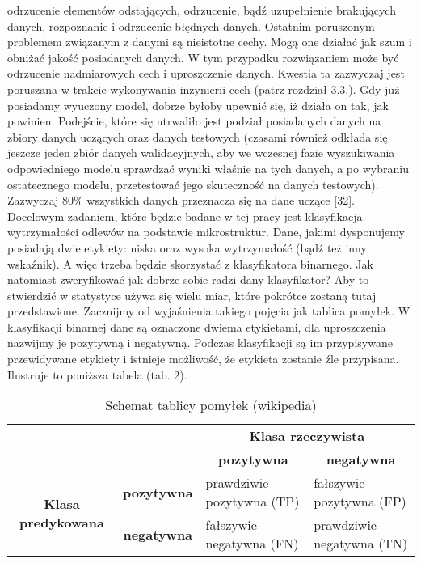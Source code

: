 odrzucenie elementów odstających,
odrzucenie, bądź uzupełnienie brakujących danych,
rozpoznanie i odrzucenie błędnych danych.
Ostatnim poruszonym problemem związanym z danymi są nieistotne cechy. Mogą one działać jak szum i obniżać jakość posiadanych danych. W tym przypadku rozwiązaniem może być odrzucenie nadmiarowych cech i uproszczenie danych. Kwestia ta zazwyczaj jest poruszana w trakcie wykonywania inżynierii cech (patrz rozdział 3.3.).
Gdy już posiadamy wyuczony model, dobrze byłoby upewnić się, iż działa on tak, jak powinien. Podejście, które się utrwaliło jest podział posiadanych danych na zbiory danych uczących oraz danych testowych (czasami również odkłada się jeszcze jeden zbiór danych walidacyjnych, aby we wczesnej fazie wyszukiwania odpowiedniego modelu sprawdzać wyniki właśnie na tych danych, a po wybraniu ostatecznego modelu, przetestować jego skuteczność na danych testowych). Zazwyczaj 80\% wszystkich danych przeznacza się na dane uczące [32].
Docelowym zadaniem, które będzie badane w tej pracy jest klasyfikacja wytrzymałości odlewów na podstawie mikrostruktur. Dane, jakimi dysponujemy posiadają dwie etykiety: niska oraz wysoka wytrzymałość (bądź też inny wskaźnik). A więc trzeba będzie skorzystać z klasyfikatora binarnego. Jak natomiast zweryfikować jak dobrze sobie radzi dany klasyfikator? Aby to stwierdzić w statystyce używa się wielu miar, które pokrótce zostaną tutaj przedstawione. Zacznijmy od wyjaśnienia takiego pojęcia jak tablica pomyłek. W klasyfikacji binarnej dane są oznaczone dwiema etykietami, dla uproszczenia nazwijmy je pozytywną i negatywną. Podczas klasyfikacji są im przypisywane przewidywane etykiety i istnieje możliwość, że etykieta zostanie źle przypisana. Ilustruje to poniższa tabela (tab. 2).

\begin{table}[h]
	\centering
	
	\begin{threeparttable}
		\caption{Schemat tablicy pomyłek (wikipedia)}
		\label{tab:tab2}
				
		\begin{tabularx}{1\textwidth}{ |c|c|X|X| }\hline
		  \multicolumn{2}{|c|}{\multirow{2}{*}{}} & \multicolumn{2}{|c|}{\textbf{Klasa rzeczywista}}\\ \cline{3-4}
      
		  \multicolumn{2}{|c|}{} & \multicolumn{1}{|c|}{\textbf{pozytywna}} & \multicolumn{1}{c|}{\textbf{negatywna}}\\ \hline
       
		  \multirow{2}{*}{\textbf{Klasa predykowana}} & \textbf{pozytywna} & prawdziwie pozytywna (TP) & fałszywie pozytywna (FP)\\ \cline{2-4}
      
		   & \textbf{negatywna} & fałszywie negatywna (FN) & prawdziwie negatywna (TN)\\ \hline
		\end{tabularx}

	\end{threeparttable}
\end{table}

